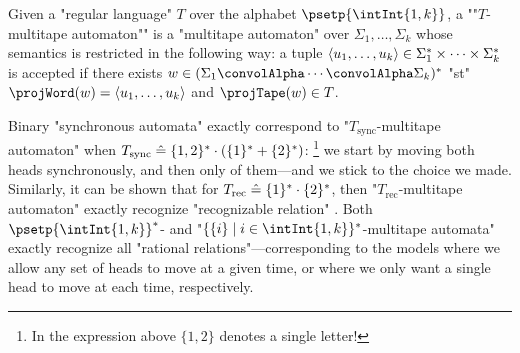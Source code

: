 Given a "regular language" $T$ over the alphabet $\psetp{\intInt{1,k}}$,
a \AP""$T$-multitape automaton"" is a "multitape automaton" over $\Sigma_1,\dotsc,\Sigma_k$
whose semantics is restricted in the following way:
a tuple $\langle u_1,\dotsc,u_k\rangle \in \Sigma_1^* \times \cdots \times \Sigma_k^*$ is accepted
if there exists $w \in (\Sigma_1 \convolAlpha \cdots \convolAlpha \Sigma_k)^*$
"st" $\projWord(w) = \tup{u_1,\dotsc,u_k}$ and $\projTape(w) \in T$.

Binary "synchronous automata" exactly correspond to "$T_{\textrm{sync}}$-multitape automaton" when
$T_{\textrm{sync}} \mathrel{\hat{=}} \{1,2\}^* \cdot (\{1\}^* + \{2\}^*)$:%
\footnote{In the expression above $\{1,2\}$ denotes a single letter!}
we start by moving both heads synchronously, and then only of
them---and we stick to the choice we made.
Similarly, it can be shown
that for $T_{\textrm{rec}} \mathrel{\hat{=}} \{1\}^* \cdot \{2\}^*$, then "$T_{\textrm{rec}}$-multitape automaton" exactly recognize "recognizable relation"
\cite[Proposition~1]{FigueiraLibkin2015SynchronizingRelations}.
Both $\psetp{\intInt{1,k}}^*$- and
"$\{\{i\} \mid i \in \intInt{1,k}\}^*$-multitape automata"
exactly recognize all "rational relations"---corresponding to the models
where we allow any set of heads to move at a given time,
or where we only want a single head to move at each time, respectively.%

